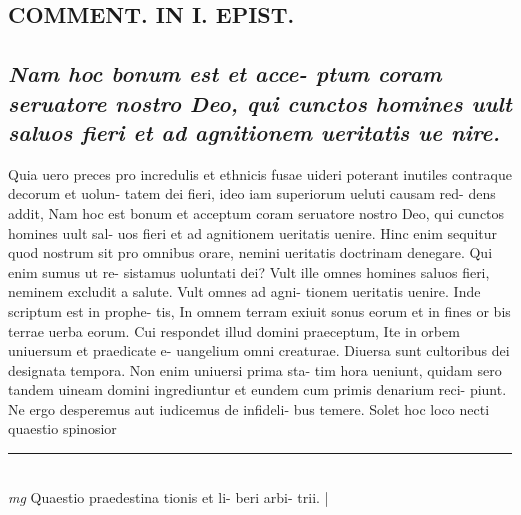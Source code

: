 \documentclass{article}
\begin{document}
\begin{pages}
\section*{COMMENT. IN I. EPIST. }
{}
\subsection*{\textit{Nam hoc bonum est et acce- ptum coram seruatore nostro Deo, qui cunctos homines uult saluos fieri et ad agnitionem ueritatis ue nire. }}\pstart Quia uero preces pro incredulis et ethnicis fusae uideri poterant inutiles contraque decorum et uolun- tatem dei fieri, ideo iam superiorum ueluti causam red- dens addit, Nam hoc est bonum et acceptum coram seruatore nostro Deo, qui cunctos homines uult sal- uos fieri et ad agnitionem ueritatis uenire. Hinc enim sequitur quod nostrum sit pro omnibus orare, nemini ueritatis doctrinam denegare. Qui enim sumus ut re- sistamus uoluntati dei? Vult ille omnes homines saluos fieri, neminem excludit a salute. Vult omnes ad agni- tionem ueritatis uenire. Inde scriptum est in prophe- tis, In omnem terram exiuit sonus eorum et in fines or bis terrae uerba eorum. Cui respondet illud domini praeceptum, Ite in orbem uniuersum et praedicate e- uangelium omni creaturae. Diuersa sunt cultoribus dei designata tempora. Non enim uniuersi prima sta- tim hora ueniunt, quidam sero tandem uineam domini ingrediuntur et eundem cum primis denarium reci- piunt. Ne ergo desperemus aut iudicemus de infideli- bus temere. Solet hoc loco necti quaestio spinosior  \pend
\vspace{0.5cm}\noindent
\vspace{0.2cm}\rule{1cm}{0.2pt}\\ 
\hspace{0.2cm}\textit{mg}
\footnotesize Quaestio praedestina tionis et li- beri arbi- trii. 
\normalsize| 

\end{pages}
\end{document}
